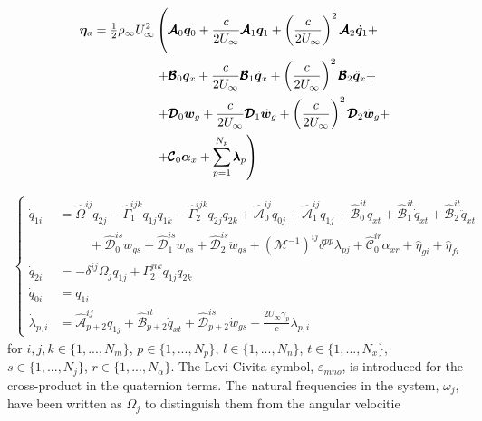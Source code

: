 \documentclass[11pt]{article}
\begin{document}
\begin{equation}\label{eq3:eta_full}
\begin{split}
\bm{\eta}_a = \tfrac12\rho_\infty U_\infty^2 & \left(\vphantom{\sum_{p=1}^{N_p}} \pmb{\mathcal{A}}_0\bm{q}_0 +\frac{c}{2U_\infty}\pmb{\mathcal{A}}_1 \bm{q}_1 +\left(\frac{c}{2U_\infty}\right)^2 \pmb{\mathcal{A}}_2\dot{\bm{q}}_1 +  \right.  \\
& \left. + \pmb{\mathcal{B}}_0\bm{q}_x +\frac{c}{2U_\infty}\pmb{\mathcal{B}}_1 \dot{\bm{q}}_x +\left(\frac{c}{2U_\infty}\right)^2 \pmb{\mathcal{B}}_2\ddot{\bm{q}}_x +  \right.  \\
& \left. + \pmb{\mathcal{D}}_{0}\bm{w}_g +\frac{c}{2U_\infty}\pmb{\mathcal{D}}_{1} \dot{\bm{w}}_g +\left(\frac{c}{2U_\infty}\right)^2 \pmb{\mathcal{D}}_{2}\ddot{\bm{w}}_g +  \right.  \\
& \left. + \pmb{\mathcal{C}}_0\bm{\alpha}_x \vphantom{\sum_{p=1}^{N_p}} + \sum_{p=1}^{N_p} \pmb{\lambda}_p  \right) 
\end{split}
\end{equation}



\begin{equation}
\label{eq3:intrinsic_full_aeroelastic}
\begin{split}
\begin{cases}
              \dot{q}_{1i} &= \hat{\Omega}^{ij} q_{2j}
              - \hat{\Gamma}_{1}^{ijk}q_{1j}q_{1k}
              - \hat{\Gamma}_{2}^{ijk}q_{2j}q_{2k} 
              + \hat{\mathcal{A}}^{ij}_{0}q_{0j}
              + \hat{\mathcal{A}}^{ij}_{1}q_{1j}  
              + \hat{\mathcal{B}}^{it}_{0}q_{xt}
              + \hat{\mathcal{B}}^{it}_{1}\dot{q}_{xt}
              + \hat{\mathcal{B}}^{it}_{2}\ddot{q}_{xt} \\
              & \hspace{1cm}+ \hat{\mathcal{D}}^{is}_{0}w_{gs}
              + \hat{\mathcal{D}}^{is}_{1}\dot{w}_{gs}
              + \hat{\mathcal{D}}^{is}_{2}\ddot{w}_{gs}              
              + \left(\mathcal{M}^{-1}\right)^{ij} \delta^{pp} \lambda_{pj}
              + \hat{\mathcal{C}}_0^{ir}\alpha_{xr} 
              + \hat{\eta}_{gi} + \hat{\eta}_{fi}\\
\dot{q}_{2i} &= -\delta^{ij}\Omega_j q_{1j}+ \Gamma_2^{jik}q_{1j}q_{2k}\\
\dot{q}_{0i} &= q_{1i} \\
 \dot{\lambda}_{p,i} &= \hat{\mathcal{A}}^{ij}_{p+2}q_{1j}
                                      + \hat{\mathcal{B}}^{it}_{p+2}\dot{q}_{xt}
                                      + \hat{\mathcal{D}}^{is}_{p+2}\dot{w}_{gs}
                                      -\frac{2U_\infty\gamma_p }{c}\lambda_{p,i} 
\end{cases}
\end{split}
\end{equation}
%
for $i,j,k \in \{1,...,N_m\}$, $p \in \{1,...,N_p\}$, $l \in \{1,...,N_{n}\}$, $t \in  \{1,...,N_{x}\}$, $s  \in \{1,...,N_{j} \}$, $r \in \{1,...,N_{\alpha}\}$. The Levi-Civita symbol, $\varepsilon_{mno}$, is introduced for the cross-product in the quaternion terms. The natural frequencies in the system, $\omega_j$, have been written as  $\Omega_j$ to distinguish them from the angular velocitie
\end{document}
